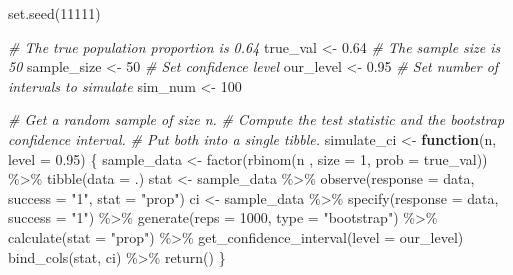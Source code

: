 \documentclass[
]{book}
\newenvironment{Shaded}{\begin{snugshade}}{\end{snugshade}}
\newcommand{\AttributeTok}[1]{\textcolor[rgb]{0.77,0.63,0.00}{#1}}
\newcommand{\CommentTok}[1]{\textcolor[rgb]{0.56,0.35,0.01}{\textit{#1}}}
\newcommand{\ControlFlowTok}[1]{\textcolor[rgb]{0.13,0.29,0.53}{\textbf{#1}}}
\newcommand{\DecValTok}[1]{\textcolor[rgb]{0.00,0.00,0.81}{#1}}
\newcommand{\FloatTok}[1]{\textcolor[rgb]{0.00,0.00,0.81}{#1}}
\newcommand{\FunctionTok}[1]{\textcolor[rgb]{0.00,0.00,0.00}{#1}}
\newcommand{\NormalTok}[1]{#1}
\newcommand{\OtherTok}[1]{\textcolor[rgb]{0.56,0.35,0.01}{#1}}
\newcommand{\SpecialCharTok}[1]{\textcolor[rgb]{0.00,0.00,0.00}{#1}}
\newcommand{\StringTok}[1]{\textcolor[rgb]{0.31,0.60,0.02}{#1}}
\begin{document}
\begin{Shaded}
\begin{Highlighting}[]
\FunctionTok{set.seed}\NormalTok{(}\DecValTok{11111}\NormalTok{)}

\CommentTok{\# The true population proportion is 0.64}
\NormalTok{true\_val }\OtherTok{\textless{}{-}} \FloatTok{0.64}
\CommentTok{\# The sample size is 50}
\NormalTok{sample\_size }\OtherTok{\textless{}{-}} \DecValTok{50}
\CommentTok{\# Set confidence level}
\NormalTok{our\_level }\OtherTok{\textless{}{-}} \FloatTok{0.95}
\CommentTok{\# Set number of intervals to simulate}
\NormalTok{sim\_num }\OtherTok{\textless{}{-}} \DecValTok{100}

\CommentTok{\# Get a random sample of size n.}
\CommentTok{\# Compute the test statistic and the bootstrap confidence interval.}
\CommentTok{\# Put both into a single tibble.}
\NormalTok{simulate\_ci }\OtherTok{\textless{}{-}} \ControlFlowTok{function}\NormalTok{(n, }\AttributeTok{level =} \FloatTok{0.95}\NormalTok{) \{}
\NormalTok{    sample\_data }\OtherTok{\textless{}{-}}
        \FunctionTok{factor}\NormalTok{(}\FunctionTok{rbinom}\NormalTok{(n , }\AttributeTok{size =} \DecValTok{1}\NormalTok{, }\AttributeTok{prob =}\NormalTok{ true\_val)) }\SpecialCharTok{\%\textgreater{}\%}
        \FunctionTok{tibble}\NormalTok{(}\AttributeTok{data =}\NormalTok{ .)}
\NormalTok{    stat }\OtherTok{\textless{}{-}}\NormalTok{ sample\_data }\SpecialCharTok{\%\textgreater{}\%}
        \FunctionTok{observe}\NormalTok{(}\AttributeTok{response =}\NormalTok{ data, }\AttributeTok{success =} \StringTok{"1"}\NormalTok{, }\AttributeTok{stat =} \StringTok{"prop"}\NormalTok{)}
\NormalTok{    ci }\OtherTok{\textless{}{-}}\NormalTok{ sample\_data }\SpecialCharTok{\%\textgreater{}\%}
        \FunctionTok{specify}\NormalTok{(}\AttributeTok{response =}\NormalTok{ data, }\AttributeTok{success =} \StringTok{"1"}\NormalTok{) }\SpecialCharTok{\%\textgreater{}\%}
        \FunctionTok{generate}\NormalTok{(}\AttributeTok{reps =} \DecValTok{1000}\NormalTok{, }\AttributeTok{type =} \StringTok{"bootstrap"}\NormalTok{) }\SpecialCharTok{\%\textgreater{}\%}
        \FunctionTok{calculate}\NormalTok{(}\AttributeTok{stat =} \StringTok{"prop"}\NormalTok{) }\SpecialCharTok{\%\textgreater{}\%}
        \FunctionTok{get\_confidence\_interval}\NormalTok{(}\AttributeTok{level =}\NormalTok{ our\_level)}
    \FunctionTok{bind\_cols}\NormalTok{(stat, ci) }\SpecialCharTok{\%\textgreater{}\%}
        \FunctionTok{return}\NormalTok{()}
\NormalTok{\}}


\end{Highlighting}
\end{Shaded}
\end{document}
